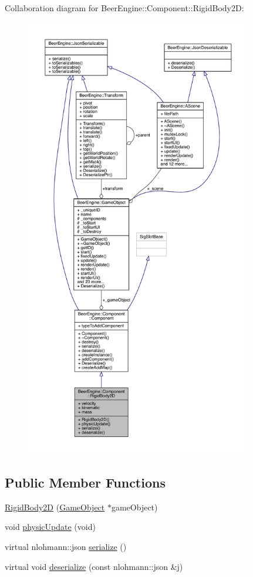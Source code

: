 Collaboration diagram for Beer\+Engine\+:\+:Component\+:\+:Rigid\+Body2D\+:\nopagebreak
\begin{figure}[H]
\begin{center}
\leavevmode
\includegraphics[height=550pt]{class_beer_engine_1_1_component_1_1_rigid_body2_d__coll__graph}
\end{center}
\end{figure}
\subsection*{Public Member Functions}
\begin{DoxyCompactItemize}
\item 
\mbox{\hyperlink{class_beer_engine_1_1_component_1_1_rigid_body2_d_a5f0d9faa4cd26f4628f9af1601868e3d}{Rigid\+Body2D}} (\mbox{\hyperlink{class_beer_engine_1_1_game_object}{Game\+Object}} $\ast$game\+Object)
\item 
void \mbox{\hyperlink{class_beer_engine_1_1_component_1_1_rigid_body2_d_ab452ad926f43ec0cb06ace5f187d8efd}{physic\+Update}} (void)
\item 
virtual nlohmann\+::json \mbox{\hyperlink{class_beer_engine_1_1_component_1_1_rigid_body2_d_afd6b6d4073e564a1c536243027bb8597}{serialize}} ()
\item 
virtual void \mbox{\hyperlink{class_beer_engine_1_1_component_1_1_rigid_body2_d_ae070289cdf3c6fde105671d41ee8315a}{deserialize}} (const nlohmann\+::json \&j)
\end{DoxyCompactItemize}
